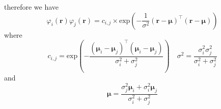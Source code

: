 \documentclass[]{article}
\begin{document}
therefore we have
\begin{equation}
 \varphi_i(\mathbf r)\varphi_j(\mathbf r)=c_{i,j}\times\mathrm{exp}\left({-\frac{1}{\sigma^2} (\mathbf r-\boldsymbol \mu)^\top(\mathbf r-\boldsymbol\mu)}\right)
\end{equation}
where
\begin{equation}
 c_{i,j}=\mathrm{exp}\left(-\frac{(\boldsymbol \mu_i-\boldsymbol\mu_j)^\top(\boldsymbol \mu_i-\boldsymbol\mu_j)}{\sigma_i^2+\sigma_j^2}\right) \quad \sigma^2=\frac{\sigma_i^2\sigma_j^2}{\sigma_i^2+\sigma_j^2}
\end{equation}
and
\begin{equation}
 \boldsymbol\mu=\frac{\sigma_j^2\boldsymbol\mu_i+\sigma_i^2\boldsymbol\mu_j}{\sigma_i^2+\sigma_j^2}
\end{equation}
\end{document}
